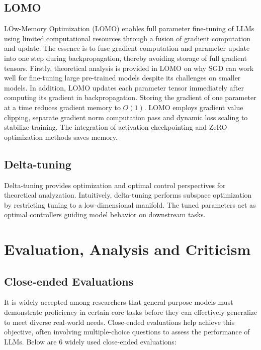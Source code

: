 \documentclass[11pt]{article}
\begin{document}
    \subsection{LOMO}
LOw-Memory Optimization (LOMO) \cite{Lv2023FullPF} enables full parameter fine-tuning of LLMs using limited computational resources through a fusion of gradient computation and update. The essence is to fuse gradient computation and parameter update into one step during backpropagation, thereby avoiding storage of full gradient tensors. Firstly, theoretical analysis is provided in LOMO on why SGD can work well for fine-tuning large pre-trained models despite its challenges on smaller models. In addition, LOMO updates each parameter tensor immediately after computing its gradient in backpropagation. Storing the gradient of one parameter at a time reduces gradient memory to $O(1)$. LOMO employs gradient value clipping, separate gradient norm computation pass and dynamic loss scaling to stabilize training. The integration of activation checkpointing and ZeRO optimization methods saves memory.
    
    \subsection{Delta-tuning}
Delta-tuning \cite{Ding2023ParameterefficientFO} provides optimization and optimal control perspectives for theoretical analyzation. Intuitively, delta-tuning performs subspace optimization by restricting tuning to a low-dimensional manifold. The tuned parameters act as optimal controllers guiding model behavior on downstream tasks.


\section{Evaluation, Analysis and Criticism}
\label{analysis}

\subsection{Close-ended Evaluations}
It is widely accepted among researchers that general-purpose models must demonstrate proficiency in certain core tasks before they can effectively generalize to meet diverse real-world needs. Close-ended evaluations help achieve this objective, often involving multiple-choice questions to assess the performance of LLMs.
Below are 6 widely used close-ended evaluations:
\end{document}
